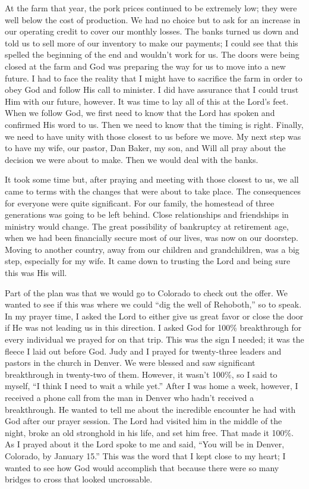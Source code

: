 \documentclass[oneside]{book}
\begin{document}
At the farm that year, the pork prices continued to be extremely low; they were well below the cost of production. We had no choice but to ask for an increase in our operating credit to cover our monthly losses. The banks turned us down and told us to sell more of our inventory to make our payments; I could see that this spelled the beginning of the end and wouldn’t work for us. The doors were being closed at the farm and God was preparing the way for us to move into a new future. I had to face the reality that I might have to sacrifice the farm in order to obey God and follow His call to minister. I did have assurance that I could trust Him with our future, however. It was time to lay all of this at the Lord’s feet. When we follow God, we first need to know that the Lord has spoken and confirmed His word to us. Then we need to know that the timing is right. Finally, we need to have unity with those closest to us before we move.  My next step was to have my wife, our pastor, Dan Baker, my son, and Will all pray about the decision we were about to make. Then we would deal with the banks.

It took some time but, after praying and meeting with those closest to us, we all came to terms with the changes that were about to take place. The consequences for everyone were quite significant. For our family, the homestead of three generations was going to be left behind. Close relationships and friendships in ministry would change. The great possibility of bankruptcy at retirement age, when we had been financially secure most of our lives, was now on our doorstep. Moving to another country, away from our children and grandchildren, was a big step, especially for my wife. It came down to trusting the Lord and being sure this was His will.

Part of the plan was that we would go to Colorado to check out the offer. We wanted to see if this was where we could “dig the well of Rehoboth,” so to speak. In my prayer time, I asked the Lord to either give us great favor or close the door if He was not leading us in this direction. I asked God for 100\% breakthrough for every individual we prayed for on that trip. This was the sign I needed; it was the fleece I laid out before God. Judy and I prayed for twenty-three leaders and pastors in the church in Denver. We were blessed and saw significant breakthrough in twenty-two of them. However, it wasn’t 100\%, so I said to myself, “I think I need to wait a while yet.” After I was home a week, however, I received a phone call from the man in Denver who hadn’t received a breakthrough. He wanted to tell me about the incredible encounter he had with God after our prayer session. The Lord had visited him in the middle of the night, broke an old stronghold in his life, and set him free. That made it 100\%. As I prayed about it the Lord spoke to me and said, “You will be in Denver, Colorado, by January 15.” This was the word that I kept close to my heart; I wanted to see how God would accomplish that because there were so many bridges to cross that looked uncrossable.
\end{document}
